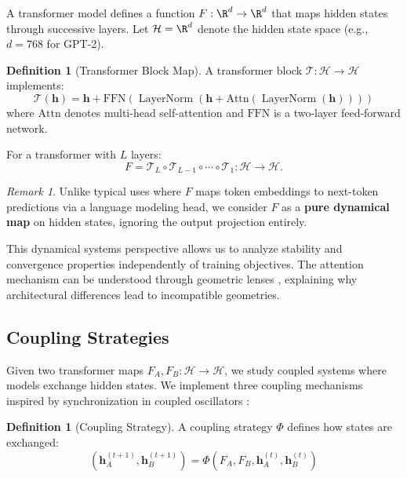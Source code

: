 \documentclass[10pt]{article} %
\theoremstyle{plain}
\theoremstyle{definition}
\newtheorem{definition}[theorem]{Definition}
\theoremstyle{remark}
\newtheorem{remark}[theorem]{Remark}
\newcommand{\cH}{\mathcal{H}}
\newcommand{\cT}{\mathcal{T}}
\newcommand{\vect}[1]{\bm{#1}}
\DeclareMathOperator{\LayerNorm}{LayerNorm}
\begin{document}
A transformer model defines a function $F: \R^d \to \R^d$ that maps hidden states through successive layers. Let $\cH = \R^d$ denote the hidden state space (e.g., $d = 768$ for GPT-2).

\begin{definition}[Transformer Block Map]
A transformer block $\cT: \cH \to \cH$ implements:
\begin{equation}
    \cT(\vect{h}) = \vect{h} + \text{FFN}\left(\LayerNorm\left(\vect{h} + \text{Attn}(\LayerNorm(\vect{h}))\right)\right)
\end{equation}
where $\text{Attn}$ denotes multi-head self-attention and $\text{FFN}$ is a two-layer feed-forward network.
\end{definition}

For a transformer with $L$ layers:
\begin{equation}
    F = \mathcal{T}_L \circ \mathcal{T}_{L-1} \circ \cdots \circ \mathcal{T}_1 : \cH \to \cH.
\end{equation}

\begin{remark}
Unlike typical uses where $F$ maps token embeddings to next-token predictions via a language modeling head, we consider $F$ as a \textbf{pure dynamical map} on hidden states, ignoring the output projection entirely.
\end{remark}

This dynamical systems perspective \citep{haber2017stable,chen2018neuralode} allows us to analyze stability and convergence properties independently of training objectives. The attention mechanism can be understood through geometric lenses \citep{tsai2019transformer}, explaining why architectural differences lead to incompatible geometries.

\subsection{Coupling Strategies}

Given two transformer maps $F_A, F_B: \cH \to \cH$, we study coupled systems where models exchange hidden states. We implement three coupling mechanisms inspired by synchronization in coupled oscillators \citep{kuramoto1984chemical}:

\begin{definition}[Coupling Strategy]
A coupling strategy $\Phi$ defines how states are exchanged:
\begin{equation}
    (\vect{h}_A^{(t+1)}, \vect{h}_B^{(t+1)}) = \Phi(F_A, F_B, \vect{h}_A^{(t)}, \vect{h}_B^{(t)})
\end{equation}
\end{definition}
\end{document}
